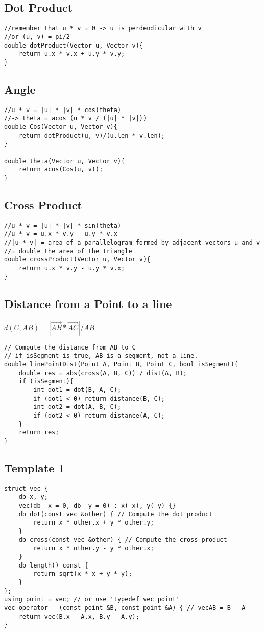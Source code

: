 \documentclass[11pt,a4paper]{article}
\begin{document}
\begin{multicols*}{2}
\subsection{Dot Product}
\begin{lstlisting}
//remember that u * v = 0 -> u is perdendicular with v
//or (u, v) = pi/2
double dotProduct(Vector u, Vector v){
    return u.x * v.x + u.y * v.y; 
}
\end{lstlisting}
\subsection{Angle}
\begin{lstlisting}
//u * v = |u| * |v| * cos(theta)
//-> theta = acos (u * v / (|u| * |v|))
double Cos(Vector u, Vector v){
    return dotProduct(u, v)/(u.len * v.len);
}

double theta(Vector u, Vector v){
    return acos(Cos(u, v));
}
\end{lstlisting}

\subsection{Cross Product}
\begin{lstlisting}
//u * v = |u| * |v| * sin(theta)
//u * v = u.x * v.y - u.y * v.x
//|u * v| = area of a parallelogram formed by adjacent vectors u and v 
//= double the area of the triangle 
double crossProduct(Vector u, Vector v){
    return u.x * v.y - u.y * v.x;
}
\end{lstlisting}

\subsection{Distance from a Point to a line}
$d(C, AB) = |\vec{AB} * \vec{AC}|/AB $
\begin{lstlisting}
// Compute the distance from AB to C
// if isSegment is true, AB is a segment, not a line.
double linePointDist(Point A, Point B, Point C, bool isSegment){
    double res = abs(cross(A, B, C)) / dist(A, B);
    if (isSegment){
        int dot1 = dot(B, A, C);
        if (dot1 < 0) return distance(B, C);
        int dot2 = dot(A, B, C);
        if (dot2 < 0) return distance(A, C);
    }
    return res;
}
\end{lstlisting}

\subsection{Template 1}
\begin{lstlisting}
struct vec {
    db x, y;
    vec(db _x = 0, db _y = 0) : x(_x), y(_y) {}
    db dot(const vec &other) { // Compute the dot product
        return x * other.x + y * other.y;
    }
    db cross(const vec &other) { // Compute the cross product
        return x * other.y - y * other.x;
    }
    db length() const {
        return sqrt(x * x + y * y);
    }
};
using point = vec; // or use 'typedef vec point'
vec operator - (const point &B, const point &A) { // vecAB = B - A
    return vec(B.x - A.x, B.y - A.y);
}


\end{lstlisting}
\end{multicols*}
\end{document}
